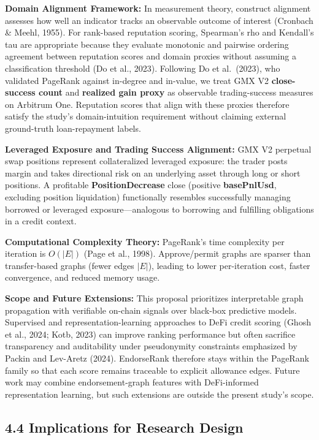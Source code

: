 \textbf{Domain Alignment Framework: }In measurement theory, construct alignment assesses how well an indicator tracks an observable outcome of interest (Cronbach \& Meehl, 1955). For rank-based reputation scoring, Spearman's rho and Kendall's tau are appropriate because they evaluate monotonic and pairwise ordering agreement between reputation scores and domain proxies without assuming a classification threshold (Do et al., 2023). Following Do et al.\ (2023), who validated PageRank against in-degree and in-value, we treat GMX V2 \textbf{close-success count} and \textbf{realized gain proxy} as observable trading-success measures on Arbitrum One. Reputation scores that align with these proxies therefore satisfy the study's domain-intuition requirement without claiming external ground-truth loan-repayment labels.


\textbf{Leveraged Exposure and Trading Success Alignment: }GMX V2 perpetual swap positions represent collateralized leveraged exposure: the trader posts margin and takes directional risk on an underlying asset through long or short positions. A profitable \textbf{PositionDecrease} close (positive \textbf{basePnlUsd}, excluding position liquidation) functionally resembles successfully managing borrowed or leveraged exposure---analogous to borrowing and fulfilling obligations in a credit context.


\textbf{Computational Complexity Theory: }PageRank's time complexity per iteration is $O(|E|)$ (Page et al., 1998). Approve/permit graphs are sparser than transfer-based graphs (fewer edges $|E|$), leading to lower per-iteration cost, faster convergence, and reduced memory usage.


\textbf{Scope and Future Extensions: }This proposal prioritizes interpretable graph propagation with verifiable on-chain signals over black-box predictive models. Supervised and representation-learning approaches to DeFi credit scoring (Ghosh et al., 2024; Kotb, 2023) can improve ranking performance but often sacrifice transparency and auditability under pseudonymity constraints emphasized by Packin and Lev-Aretz (2024). EndorseRank therefore stays within the PageRank family so that each score remains traceable to explicit allowance edges. Future work may combine endorsement-graph features with DeFi-informed representation learning, but such extensions are outside the present study's scope.


\subsection*{4.4 Implications for Research Design}
\label{sec:implications-for-research-design}

